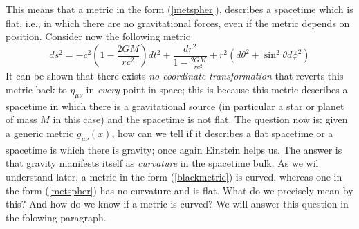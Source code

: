This means that a metric in the form (\ref{metspher}), describes a spacetime which is flat, i.e., in which there are no gravitational forces, even if the metric depends on position. Consider now the following metric
\begin{equation}
\label{blackmetric}
ds^2=-c^2\left(1-\frac{2GM}{rc^2}\right)dt^2+\frac{dr^2}{1-\frac{2GM}{rc^2}}+r^2(d\theta^2+\sin^2{\theta}d\phi^2)
\end{equation}
It can be shown that there exists \textit{no coordinate transformation} that reverts this metric back to $\eta_{\mu\nu}$ in \textit{every} point in space; this is because this metric describes a spacetime in which there is a gravitational source (in particular a star or planet of mass $M$ in this case) and the spacetime is not flat. The question now is: given a generic metric $g_{\mu\nu}(x)$, how can we tell if it describes a flat spacetime or a spacetime is which there is gravity; once again Einstein helps us. The answer is that gravity manifests itself as \textit{curvature} in the spacetime bulk. As we wil understand later, a metric in the form (\ref{blackmetric}) is curved, whereas one in the form (\ref{metspher}) has no curvature and is flat. What do we precisely mean by this? And how do we know if a metric is curved? We will answer this question in the folowing paragraph. 
